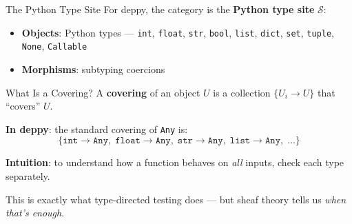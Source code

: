 \documentclass[aspectratio=169,11pt]{beamer}
\newcommand{\site}{\mathcal{S}}
\begin{document}
\begin{frame}{The Python Type Site}
For deppy, the category is the \textbf{Python type site} $\site$:
\begin{itemize}
\item \textbf{Objects}: Python types --- \texttt{int}, \texttt{float}, \texttt{str}, \texttt{bool}, \texttt{list}, \texttt{dict}, \texttt{set}, \texttt{tuple}, \texttt{None}, \texttt{Callable}
\item \textbf{Morphisms}: subtyping coercions
\end{itemize}

\vspace{0.5em}
\begin{center}
\end{center}
\end{frame}

\begin{frame}{What Is a Covering?}
A \textbf{covering} of an object $U$ is a collection $\{U_i \to U\}$ that ``covers'' $U$.

\vspace{0.5em}
\textbf{In deppy}: the standard covering of \texttt{Any} is:
\[
\{\texttt{int} \to \texttt{Any},\; \texttt{float} \to \texttt{Any},\; \texttt{str} \to \texttt{Any},\; \texttt{list} \to \texttt{Any},\; \ldots\}
\]

\vspace{0.5em}
\textbf{Intuition}: to understand how a function behaves on \emph{all} inputs, check each type separately.

\vspace{0.5em}
This is exactly what type-directed testing does --- but sheaf theory tells us \emph{when that's enough}.
\end{frame}
\end{document}

